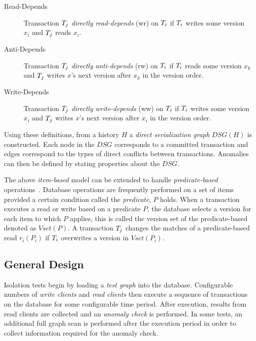 \begin{description}
  \item[Read-Depends]
    Transaction $T_j$ \emph{directly read-depends} (\textsf{wr}) on 
    $T_i$ if $T_i$ writes some version $x_i$ and $T_j$ reads $x_i$.
  \item[Anti-Depends]
    Transaction $T_j$ \emph{directly anti-depends} (\textsf{rw}) on 
    $T_i$ if $T_i$ reads some version $x_k$ and $T_j$ writes 
    $x$'s next version after $x_k$ in the version order.
  \item[Write-Depends]
    Transaction $T_j$ \emph{directly write-depends} (\textsf{ww}) on 
    $T_i$ if $T_i$ writes some version $x_i$ and $T_j$ writes 
    $x$'s next version after $x_i$ in the version order.
\end{description}


Using these definitions, from a history $H$ a \emph{direct serialization graph} 
$\textit{DSG}(H)$ is constructed. Each node in the $\textit{DSG}$ corresponds to
a committed transaction and edges correspond to the types of direct conflicts 
between transactions. Anomalies can then be defined by stating properties about
the $\textit{DSG}$.

The above \emph{item-based} model can be extended to handle 
\emph{predicate-based} operations~\cite{adya1999weak}. Database operations are 
frequently performed on a set of items provided a certain condition called the 
\emph{predicate}, $P$ holds. When a transaction executes a read or write based 
on a predicate $P$, the database selects a version for each item to which $P$ 
applies, this is called the version set of the predicate-based denoted as 
$\textit{Vset}(P)$. A transaction $T_j$ changes the matches of a 
predicate-based read $r_i(P_i)$ if $T_i$ overwrites a version 
in $\textit{Vset}(P_i)$.

\subsection{General Design}
\label{sec:design-cons}

Isolation tests begin by loading a \emph{test graph} into the database. 
Configurable numbers of \emph{write clients} and \emph{read clients} then 
execute a sequence of transactions on the database for some configurable time 
period. After execution, results from read clients are collected and an 
\emph{anomaly check} is performed. In some tests, an additional full graph scan 
is performed after the execution period in order to collect information required 
for the anomaly check.

